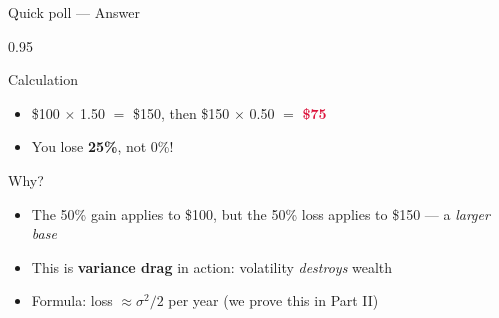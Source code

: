 \documentclass[9pt, aspectratio=169, t]{beamer}
\begin{document}
\begin{frame}{Quick poll --- Answer}
    \begin{cminipage}{0.95\textwidth}
    \begin{exampleblock}{Calculation}
    \begin{itemize}\setlength{\itemsep}{0pt}
        \item \$100 $\times$ 1.50 $=$ \$150, then \$150 $\times$ 0.50 $=$ \textcolor{Crimson}{\textbf{\$75}}
        \item You lose \textbf{25\%}, not 0\%!
    \end{itemize}
    \end{exampleblock}
    \vspace{0.3cm}
    \begin{alertblock}{Why?}
    \begin{itemize}\setlength{\itemsep}{0pt}
        \item The 50\% gain applies to \$100, but the 50\% loss applies to \$150 --- a \textit{larger base}
        \item This is \textbf{variance drag} in action: volatility \textit{destroys} wealth
        \item Formula: loss $\approx \sigma^2 / 2$ per year (we prove this in Part II)
    \end{itemize}
    \end{alertblock}
    \end{cminipage}
\end{frame}
\end{document}
